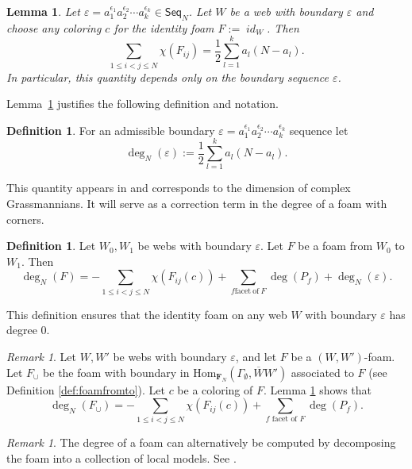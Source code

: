\documentclass[12pt]{amsart}
\newtheorem{lemma}[theorem]{Lemma}
\theoremstyle{definition}
\newtheorem{definition}[theorem]{Definition}
\theoremstyle{remark}
\newtheorem{remark}[theorem]{Remark}
\numberwithin{equation}{section}
\numberwithin{figure}{section}
\newcommand{\Hom}{\mathrm{Hom}}
\newcommand{\emptyweb}{\Gamma_{\emptyset}}
\newcommand{\Seq}{\mathsf{Seq}}
\newcommand{\Foam}{\mathbf{F}_N}
\newcommand{\foamdeg}{\deg_N}
\newcommand{\boundarydeg}{\deg_N}
\DeclareMathOperator{\idfoam}{\mathit{id}}
\begin{document}
\begin{lemma}\label{lem:euler-char-boundary-conditions}
Let
$\varepsilon=a_1^{\epsilon_1}a_2^{\epsilon_2}\cdots a_k^{\epsilon_k}
\in\Seq_N$. Let $W$ be a web with boundary $\varepsilon$ and choose any
coloring $c$ for the identity foam $F:=\idfoam_W$. Then
\[
\sum_{1\leq i<j\leq N}\chi(F_{ij})
=\frac12\sum_{l=1}^k a_l(N-a_l).
\]
In particular, this quantity depends only on the boundary sequence
$\varepsilon$.
\end{lemma}

Lemma~\ref{lem:euler-char-boundary-conditions} justifies the following
definition and notation.

\begin{definition}\label{def:deg of web with boundary}
 For an admissible boundary $\varepsilon =a_1^{\epsilon_1}a_2^{\epsilon_2}\cdots a_k^{\epsilon_k}$ sequence let
\[
\boundarydeg(\varepsilon):=\frac12\sum_{l=1}^k a_l(N-a_l).
\]
\end{definition}

This quantity appears in \cite[Section 2]{Robert2015} and corresponds to the
dimension of complex Grassmannians. It will serve as a correction term in
the degree of a foam with corners. 


\begin{definition}\label{cor:degree foam with corner alt}
Let $W_0,W_1$ be webs with boundary $\varepsilon$. Let $F$ be a foam from
$W_0$ to $W_1$. Then
\[
\foamdeg(F)
=-\sum_{1\leq i<j\leq N}\chi(F_{ij}(c))
 +\sum_{f\mathrel{\mathrm{facet\ of\ }}F}\deg(P_f)
 +\boundarydeg(\varepsilon).
\]
\end{definition}

This definition ensures that the identity foam on any web $W$ with
boundary $\varepsilon$ has degree $0$.

\begin{remark}
\label{rem:bending-up-foamdeg}
Let $W, W'$ be webs with boundary $\varepsilon$, and let $F$ be a $(W,W')$-foam.
Let $F_\cup$ be the foam with boundary in $\Hom_{\Foam}(\emptyweb, \overline{W} W')$ 
associated to $F$ (see Definition \ref{def:foamfromto}).
Let $c$ be a coloring of $F$.
Lemma \ref{lem:euler-char-boundary-conditions} shows that
\[
    \foamdeg(F_\cup)= -\sum_{1 \leq i < j \leq N} \chi(F_{ij}(c)) + \sum_{f \textrm{ facet of $F$}} \deg(P_f).
\]
\end{remark}

\begin{remark}\label{rmk:degree with decomposition}
    The degree of a foam can alternatively be computed by decomposing the foam into a collection of local models. See \cite[Definitions 2.12 and 2.13]{ETW2018}.
\end{remark}
\end{document}
